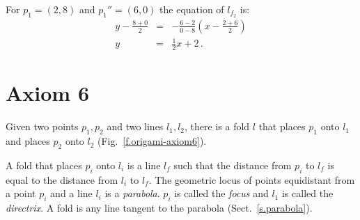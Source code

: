 \begin{example}
For $p_1=(2,8)$ and $p_1''=(6,0)$ the equation of  $l_{f_2}$ is:
%
\begin{eqnarray*}
y-\frac{8+0}{2}&=&-\frac{6-2}{0-8}\left(x-\frac{2+6}{2}\right)\\
y&=&\frac{1}{2}x+2\,.
\end{eqnarray*}
\end{example}




\section{Axiom 6}\label{s.ax6}
\begin{axiom}
Given two points $p_1,p_2$ and two lines $l_1,l_2$, there is a fold $l$ that places $p_1$ onto $l_1$ and places $p_2$ onto $l_2$ (Fig.~\ref{f.origami-axiom6}).
\end{axiom}

A fold that places $p_i$ onto $l_i$ is a line $l_f$ such that the distance from $p_i$ to $l_f$ is equal to the distance from $l_i$ to $l_f$. The geometric locus of points equidistant from a point $p_i$ and a line $l_i$ is a \emph{parabola}. $p_i$ is called the \emph{focus} and $l_1$ is called the \emph{directrix}. A fold is any line tangent to the parabola (Sect.~\ref{s.parabola}).

